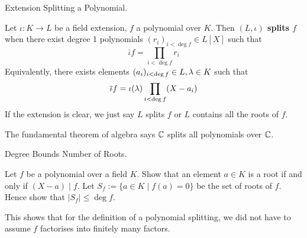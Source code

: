 \documentclass[../book.tex]{subfiles}
\begin{document}
\begin{dfn} Extension Splitting a Polynomial. 
    
    Let $\iota : K \to L$ be a field extension, $f$ a polynomial over $K$. 
    Then \textbf{$(L,\iota)$ splits $f$} when there exist degree 1 polynomials
    $(r_i)_{i<\deg f} \in L[X]$ such that \[
        \bar\iota f = \prod_{i<\deg f} r_i
    \]
    Equivalently, there exists elements $(a_i)_{i<\deg f} \in L, \lambda \in K$ 
    such that \[
        \overline{\iota} f = \iota(\lambda)\prod_{i<\deg f} (X - a_i)
    \]
    If the extension is clear, we just say $L$ splits $f$ or
    $L$ contains all the roots of $f$. 
\end{dfn}

\begin{rmk}
    
    The fundamental theorem of algebra says 
    $\mathbb{C}$ splits all polynomials over $\mathbb{C}$.
    
\end{rmk}

\begin{ex} Degree Bounds Number of Roots. 

    Let $f$ be a polynomial over a field $K$.
    Show that an element $a \in K$ is a root if and only if $(X-a) \mid f$.
    Let $S_f := \{a \in K \mid f(a) = 0\}$ be the set of roots of $f$. 
    Hence show that $|S_f| \leq \deg f$.
    
    This shows that for the definition of a polynomial splitting, 
    we did not have to assume $f$ factorises into finitely
    many factors. 
\end{ex}
\end{document}
